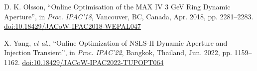 \documentclass[a4paper,
               keeplastbox,   %
               ]{jacow}
\begin{document}
\begin{thebibliography}{9}
       D. K. Olsson,
       \textquotedblleft{Online Optimisation of the MAX IV 3 GeV Ring Dynamic Aperture}\textquotedblright,
       in \emph{Proc. IPAC'18}, Vancouver, BC, Canada, Apr. 2018, pp. 2281--2283.
       \url{doi:10.18429/JACoW-IPAC2018-WEPAL047}
    
        X. Yang, \emph{et al.},
       \textquotedblleft{Online Optimization of NSLS-II Dynamic Aperture and Injection Transient}\textquotedblright,
        in \emph{Proc. IPAC'22}, Bangkok, Thailand, Jun. 2022, pp. 1159--1162.
       \url{doi:10.18429/JACoW-IPAC2022-TUPOPT064}
    
   
	\end{thebibliography}

%
% 

%
\end{document}
